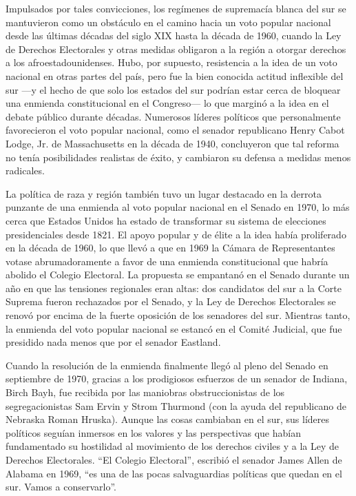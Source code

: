 Impulsados por tales convicciones, los regímenes de supremacía blanca
del sur se mantuvieron como un obstáculo en el camino hacia un voto
popular nacional desde las últimas décadas del siglo XIX hasta la década
de 1960, cuando la Ley de Derechos Electorales y otras medidas obligaron
a la región a otorgar derechos a los afroestadounidenses. Hubo, por
supuesto, resistencia a la idea de un voto nacional en otras partes del
país, pero fue la bien conocida actitud inflexible del sur ---y el hecho
de que solo los estados del sur podrían estar cerca de bloquear una
enmienda constitucional en el Congreso--- lo que marginó a la idea en el
debate público durante décadas. Numerosos líderes políticos que
personalmente favorecieron el voto popular nacional, como el senador
republicano Henry Cabot Lodge, Jr. de Massachusetts en la década de
1940, concluyeron que tal reforma no tenía posibilidades realistas de
éxito, y cambiaron su defensa a medidas menos radicales.

La política de raza y región también tuvo un lugar destacado en la
derrota punzante de una enmienda al voto popular nacional en el Senado
en 1970, lo más cerca que Estados Unidos ha estado de transformar su
sistema de elecciones presidenciales desde 1821. El apoyo popular y de
élite a la idea había proliferado en la década de 1960, lo que llevó a
que en 1969 la Cámara de Representantes votase abrumadoramente a favor
de una enmienda constitucional que habría abolido el Colegio Electoral.
La propuesta se empantanó en el Senado durante un año en que las
tensiones regionales eran altas: dos candidatos del sur a la Corte
Suprema fueron rechazados por el Senado, y la Ley de Derechos
Electorales se renovó por encima de la fuerte oposición de los senadores
del sur. Mientras tanto, la enmienda del voto popular nacional se
estancó en el Comité Judicial, que fue presidido nada menos que por el
senador Eastland.

Cuando la resolución de la enmienda finalmente llegó al pleno del Senado
en septiembre de 1970, gracias a los prodigiosos esfuerzos de un senador
de Indiana, Birch Bayh, fue recibida por las maniobras obstruccionistas
de los segregacionistas Sam Ervin y Strom Thurmond (con la ayuda del
republicano de Nebraska Roman Hruska). Aunque las cosas cambiaban en el
sur, sus líderes políticos seguían inmersos en los valores y las
perspectivas que habían fundamentado su hostilidad al movimiento de los
derechos civiles y a la Ley de Derechos Electorales. ``El Colegio
Electoral'', escribió el senador James Allen de Alabama en 1969, ``es
una de las pocas salvaguardias políticas que quedan en el sur. Vamos a
conservarlo''.


